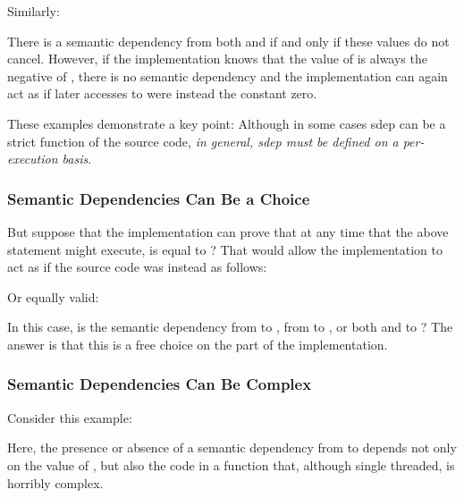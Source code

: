 \documentclass[10]{article}
\begin{document}
Similarly:

\begin{quote}
\end{quote}

There is a semantic dependency from both  and  if and only
if these values do not cancel.
However, if the implementation knows that the value of  is always
the negative of , there is no semantic dependency and the
implementation can again act as if later accesses to  were
instead the constant zero.

These examples demonstrate a key point: Although in some cases sdep can
be a strict function of the source code, \emph{in general, sdep must be
defined on a per-execution basis}.

\subsubsection{Semantic Dependencies Can Be a Choice}
\label{sec:Semantic Dependencies Can Be a Choice}

But suppose that the implementation can prove that at any time that
the above statement might execute,  is equal to ?
That would allow the implementation to act as if the source code
was instead as follows:

\begin{quote}
\end{quote}

Or equally valid:

\begin{quote}
\end{quote}

In this case, is the semantic dependency from  to ,
from  to , or both  and  to ?
The answer is that this is a free choice on the part of the
implementation.

\subsubsection{Semantic Dependencies Can Be Complex}
\label{sec:Semantic Dependencies Can Be Complex}

Consider this example:

\begin{quote}
\end{quote}

Here, the presence or absence of a semantic dependency from  to
 depends not only on the value of , but also the code in a
function that, although single threaded, is horribly complex.
\end{document}
